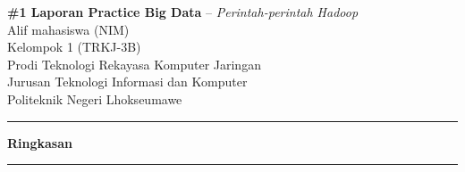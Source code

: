 \documentclass[a4paper,12pt]{article}
\renewenvironment{abstract}				%
 {\par\noindent\textbf{Ringkasan}\ \ignorespaces \\}
 {\par\noindent\medskip}
\begin{document}
\pagestyle{fancy}
\thispagestyle{empty}
\fancyhead[L]{}
\renewcommand*{\thefootnote}{\fnsymbol{footnote}}

\begin{center}
\Large{\textbf{\#1 Laporan Practice Big Data} -- \textit{Perintah-perintah Hadoop}}
\vspace{0.4cm}
\normalsize \\ 
Alif mahasiswa (NIM) \\
Kelompok 1 (TRKJ-3B) \\
\vspace{0.1cm}
\small{Prodi Teknologi Rekayasa Komputer Jaringan} \\
\small{Jurusan Teknologi Informasi dan Komputer} \\
\small{Politeknik Negeri Lhokseumawe}
\medskip
\normalsize
\end{center}

{\color{gray}\hrule}
\vspace{0.4cm}
\begin{abstract} 								%

\end{abstract}
{\color{gray}\hrule}
\medskip

\end{document}

